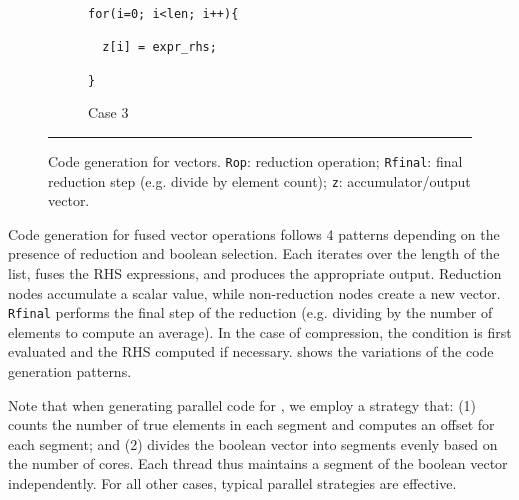 \begin{figure}[htbp]
\begin{subfigure}[t]{.45\columnwidth}
\begin{small}
\begin{verbatim}
for(i=0; i<len; i++){

  z[i] = expr_rhs;

}
\end{verbatim}
\end{small}
\caption{Case 3} \label{fig:codegen_c3}
\end{subfigure}
\vspace{1mm}
\par\noindent\rule{\columnwidth}{0.6pt}
\caption{Code generation for vectors. \texttt{Rop}: reduction operation; \texttt{Rfinal}: final reduction step (e.g. divide by element count); \texttt{z}: accumulator/output vector.} \label{fig:codegen_vectors}
\end{figure}

Code generation for fused vector operations follows 4 patterns depending on the presence
of reduction and boolean selection. Each iterates over the length of the list, fuses the
RHS expressions, and produces the appropriate output. Reduction nodes accumulate a scalar
value, while non-reduction nodes create a new vector. \texttt{Rfinal} performs the final
step of the reduction (e.g. dividing by the number of elements to compute an average).
In the case of compression, the condition is first evaluated and the RHS computed if
necessary.  shows the variations of the code generation patterns.

Note that when generating parallel code for , we employ a
strategy that:
(1) counts the number of true elements in each segment and computes an offset for
each segment; and
(2) divides the boolean vector into segments evenly based on the number of cores.
Each thread thus maintains a segment of the boolean vector independently. For all other
cases, typical parallel strategies are effective.


